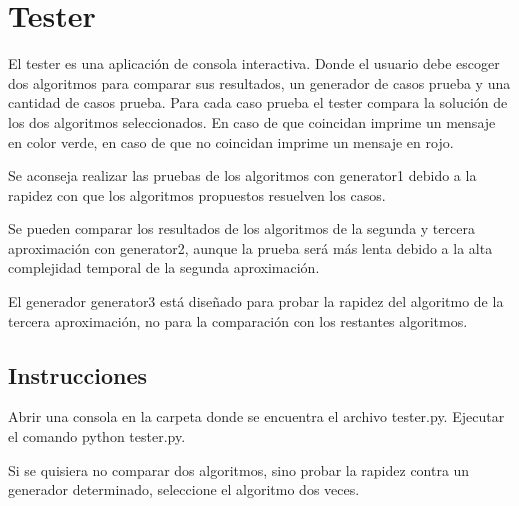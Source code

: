 \documentclass[article]{llncs}
\begin{document}
\section{Tester}

El tester es una aplicaci\'on de consola interactiva. Donde el usuario 
debe escoger dos algoritmos para comparar sus resultados, un generador 
de casos prueba y una cantidad de casos prueba. Para cada caso prueba 
el tester compara la soluci\'on de los dos algoritmos seleccionados. 
En caso de que coincidan imprime un mensaje en color verde, en caso 
de que no coincidan imprime un mensaje en rojo.

Se aconseja realizar las pruebas de los algoritmos con generator1 debido 
a la rapidez con que los algoritmos propuestos resuelven los casos.

Se pueden comparar los resultados de los algoritmos de la segunda y 
tercera aproximaci\'on con generator2, aunque la prueba ser\'a m\'as 
lenta debido a la alta complejidad temporal de la segunda aproximaci\'on.

El generador generator3 est\'a dise\~{n}ado para probar la rapidez del 
algoritmo de la tercera aproximaci\'on, no para la comparaci\'on con los 
restantes algoritmos.

\subsection{Instrucciones}

Abrir una consola en la carpeta donde se encuentra el archivo tester.py. 
Ejecutar el comando python tester.py.

Si se quisiera no comparar dos algoritmos, sino probar la rapidez contra un 
generador determinado, seleccione el algoritmo dos veces.
\end{document}
